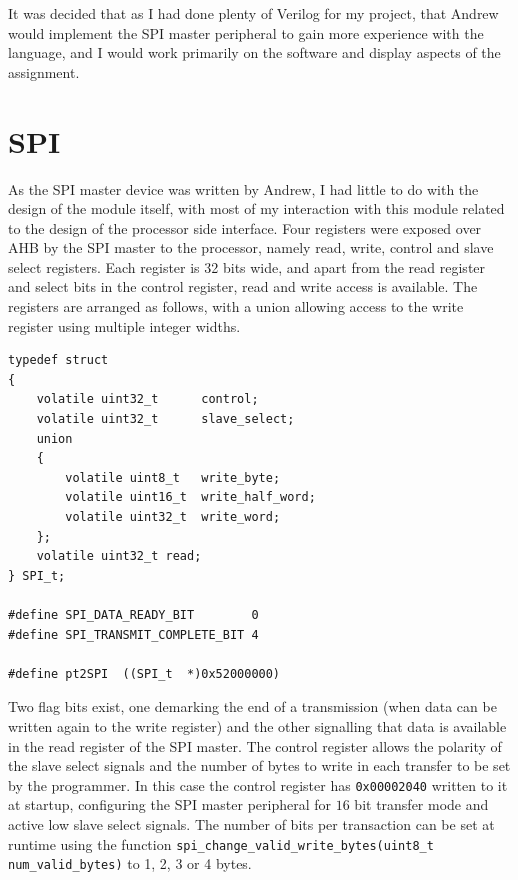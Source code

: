 \documentclass[11pt,british]{report}
\begin{document}
It was decided that as I had done plenty of Verilog for my project, that Andrew would implement the SPI master peripheral to gain more experience with the language, and I would work primarily on the software and display aspects of the assignment.

\section*{SPI}
As the SPI master device was written by Andrew, I had little to do with the design of the module itself, with most of my interaction with this module related to the design of the processor side interface. Four registers were exposed over AHB by the SPI master to the processor, namely read, write, control and slave select registers. Each register is 32 bits wide, and apart from the read register and select bits in the control register, read and write access is available. The registers are arranged as follows, with a union allowing access to the write register using multiple integer widths.
\begin{lstlisting}[style={c-style}]
typedef struct
{
	volatile uint32_t      control;
	volatile uint32_t      slave_select;
	union
	{
		volatile uint8_t   write_byte;
		volatile uint16_t  write_half_word;
		volatile uint32_t  write_word;
	};
	volatile uint32_t read;
} SPI_t;

#define SPI_DATA_READY_BIT        0
#define SPI_TRANSMIT_COMPLETE_BIT 4

#define pt2SPI  ((SPI_t  *)0x52000000)
\end{lstlisting}

Two flag bits exist, one demarking the end of a transmission (when data can be written again to the write register) and the other signalling that data is available in the read register of the SPI master. The control register allows the polarity of the slave select signals and the number of bytes to write in each transfer to be set by the programmer. In this case the control register has \texttt{0x00002040} written to it at startup, configuring the SPI master peripheral for $16$ bit transfer mode and active low slave select signals. The number of bits per transaction can be set at runtime using the function \lstinline[style={c-style}]|spi_change_valid_write_bytes(uint8_t num_valid_bytes)| to 1, 2, 3 or 4 bytes.
\end{document}
